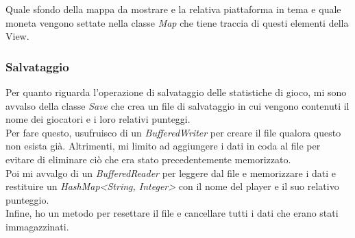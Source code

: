 \textsf{\small  Quale sfondo della mappa da mostrare e la relativa piattaforma in tema e quale moneta vengono settate nella classe \emph{Map} che tiene traccia di questi elementi della View.}\\



\subsubsection*{Salvataggio}

\textsf{\small Per quanto riguarda l'operazione di salvataggio delle statistiche di gioco, mi sono avvalso della classe \emph{Save} che crea un file di salvataggio in cui vengono contenuti il nome dei giocatori e i loro relativi punteggi.}\\

\textsf{\small Per fare questo, usufruisco di un \emph{BufferedWriter} per creare il file qualora questo non esista già. Altrimenti, mi limito ad aggiungere i dati in coda al file per evitare di eliminare ciò che era stato precedentemente memorizzato.}\\

\textsf{\small Poi mi avvalgo di un \emph{BufferedReader} per leggere dal file e memorizzare i dati e restituire un \emph{HashMap<String, Integer>} con il nome del player e il suo relativo punteggio.}\\

\textsf{\small Infine, ho un metodo per resettare il file e cancellare tutti i dati che erano stati immagazzinati.}\\


